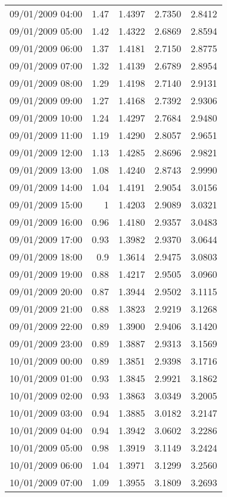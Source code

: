 \begin{longtable}{|l|r|r|r|r|}
09/01/2009 04:00 & 1.47 & 1.4397 & 2.7350 & 2.8412 \\
09/01/2009 05:00 & 1.42 & 1.4322 & 2.6869 & 2.8594 \\
09/01/2009 06:00 & 1.37 & 1.4181 & 2.7150 & 2.8775 \\
09/01/2009 07:00 & 1.32 & 1.4139 & 2.6789 & 2.8954 \\
09/01/2009 08:00 & 1.29 & 1.4198 & 2.7140 & 2.9131 \\
09/01/2009 09:00 & 1.27 & 1.4168 & 2.7392 & 2.9306 \\
09/01/2009 10:00 & 1.24 & 1.4297 & 2.7684 & 2.9480 \\
09/01/2009 11:00 & 1.19 & 1.4290 & 2.8057 & 2.9651 \\
09/01/2009 12:00 & 1.13 & 1.4285 & 2.8696 & 2.9821 \\
09/01/2009 13:00 & 1.08 & 1.4240 & 2.8743 & 2.9990 \\
09/01/2009 14:00 & 1.04 & 1.4191 & 2.9054 & 3.0156 \\
09/01/2009 15:00 & 1 & 1.4203 & 2.9089 & 3.0321 \\
09/01/2009 16:00 & 0.96 & 1.4180 & 2.9357 & 3.0483 \\
09/01/2009 17:00 & 0.93 & 1.3982 & 2.9370 & 3.0644 \\
09/01/2009 18:00 & 0.9 & 1.3614 & 2.9475 & 3.0803 \\
09/01/2009 19:00 & 0.88 & 1.4217 & 2.9505 & 3.0960 \\
09/01/2009 20:00 & 0.87 & 1.3944 & 2.9502 & 3.1115 \\
09/01/2009 21:00 & 0.88 & 1.3823 & 2.9219 & 3.1268 \\
09/01/2009 22:00 & 0.89 & 1.3900 & 2.9406 & 3.1420 \\
09/01/2009 23:00 & 0.89 & 1.3887 & 2.9313 & 3.1569 \\
10/01/2009 00:00 & 0.89 & 1.3851 & 2.9398 & 3.1716 \\
10/01/2009 01:00 & 0.93 & 1.3845 & 2.9921 & 3.1862 \\
10/01/2009 02:00 & 0.93 & 1.3863 & 3.0349 & 3.2005 \\
10/01/2009 03:00 & 0.94 & 1.3885 & 3.0182 & 3.2147 \\
10/01/2009 04:00 & 0.94 & 1.3942 & 3.0602 & 3.2286 \\
10/01/2009 05:00 & 0.98 & 1.3919 & 3.1149 & 3.2424 \\
10/01/2009 06:00 & 1.04 & 1.3971 & 3.1299 & 3.2560 \\
10/01/2009 07:00 & 1.09 & 1.3955 & 3.1809 & 3.2693 \\

\end{longtable}
